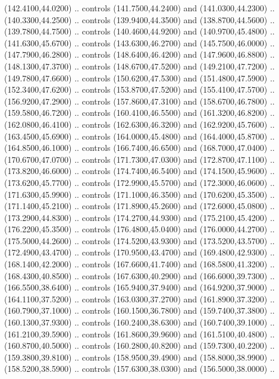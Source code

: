 {\begin{scope}[y=0.80pt, x=0.80pt, yscale=-1, xscale=1, inner sep=0pt, outer sep=0pt, #1]
      (142.4100,44.0200) .. controls (141.7500,44.2400) and (141.0300,44.2300) ..
      (140.3300,44.2500) .. controls (139.9400,44.3500) and (138.8700,44.5600) ..
      (139.7800,44.7500) .. controls (140.4600,44.9200) and (140.9700,45.4800) ..
      (141.6300,45.6700) .. controls (143.6300,46.2700) and (145.7500,46.0000) ..
      (147.7900,46.2800) .. controls (148.6400,46.4200) and (147.9600,46.8800) ..
      (148.1300,47.3700) .. controls (148.6700,47.5200) and (149.2100,47.7200) ..
      (149.7800,47.6600) .. controls (150.6200,47.5300) and (151.4800,47.5900) ..
      (152.3400,47.6200) .. controls (153.8700,47.5200) and (155.4100,47.5700) ..
      (156.9200,47.2900) .. controls (157.8600,47.3100) and (158.6700,46.7800) ..
      (159.5800,46.7200) .. controls (160.4100,46.5500) and (161.3200,46.8200) ..
      (162.0800,46.4100) .. controls (162.6300,46.3200) and (162.9200,45.7600) ..
      (163.4500,45.6900) .. controls (164.0000,45.4800) and (164.4000,45.8700) ..
      (164.8500,46.1000) .. controls (166.7400,46.6500) and (168.7000,47.0400) ..
      (170.6700,47.0700) .. controls (171.7300,47.0300) and (172.8700,47.1100) ..
      (173.8200,46.6000) .. controls (174.7400,46.5400) and (174.1500,45.9600) ..
      (173.6200,45.7700) .. controls (172.9900,45.5700) and (172.3000,46.0600) ..
      (171.6300,45.9900) .. controls (171.1000,46.3500) and (170.6200,45.3500) ..
      (171.1400,45.2100) .. controls (171.8900,45.2600) and (172.6000,45.0800) ..
      (173.2900,44.8300) .. controls (174.2700,44.9300) and (175.2100,45.4200) ..
      (176.2200,45.3500) .. controls (176.4800,45.0400) and (176.0000,44.2700) ..
      (175.5000,44.2600) .. controls (174.5200,43.9300) and (173.5200,43.5700) ..
      (172.4900,43.4700) .. controls (170.9500,43.4700) and (169.4800,42.9300) ..
      (168.1400,42.2000) .. controls (167.6600,41.7400) and (168.5800,41.3200) ..
      (168.4300,40.8500) .. controls (167.6300,40.2900) and (166.6000,39.7300) ..
      (166.5500,38.6400) .. controls (165.9400,37.9400) and (164.9200,37.9000) ..
      (164.1100,37.5200) .. controls (163.0300,37.2700) and (161.8900,37.3200) ..
      (160.7900,37.1000) .. controls (160.1500,36.7800) and (159.7400,37.3800) ..
      (160.1300,37.9300) .. controls (160.2400,38.6300) and (160.7400,39.1000) ..
      (161.2100,39.5900) .. controls (161.8600,39.9600) and (161.5100,40.4800) ..
      (160.8700,40.5000) .. controls (160.2800,40.8200) and (159.7300,40.2200) ..
      (159.3800,39.8100) .. controls (158.9500,39.4900) and (158.8000,38.9900) ..
      (158.5200,38.5900) .. controls (157.6300,38.0300) and (156.5000,38.0000) ..

\end{scope}}
